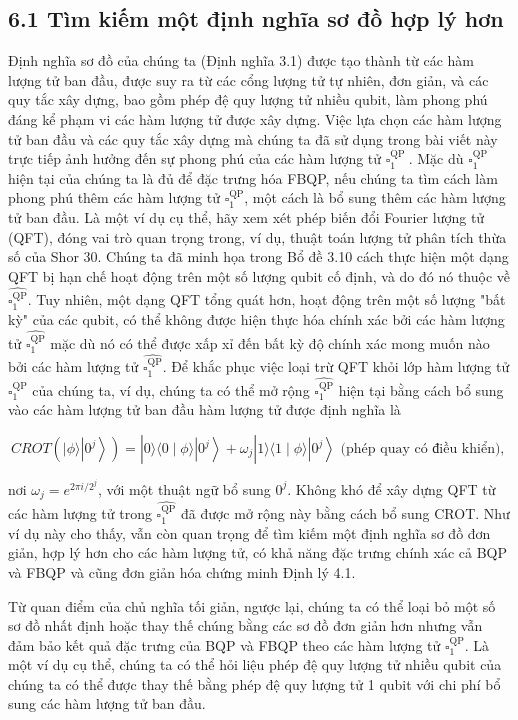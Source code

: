 \documentclass[10pt]{article}
\begin{document}
\subsection*{6.1 Tìm kiếm một định nghĩa sơ đồ hợp lý hơn}
Định nghĩa sơ đồ của chúng ta (Định nghĩa 3.1) được tạo thành từ các hàm lượng tử ban đầu, được suy ra từ các cổng lượng tử tự nhiên, đơn giản, và các quy tắc xây dựng, bao gồm phép đệ quy lượng tử nhiều qubit, làm phong phú đáng kể phạm vi các hàm lượng tử được xây dựng. Việc lựa chọn các hàm lượng tử ban đầu và các quy tắc xây dựng mà chúng ta đã sử dụng trong bài viết này trực tiếp ảnh hưởng đến sự phong phú của các hàm lượng tử $\square_{1}^{\text {QP }}$. Mặc dù $\square_{1}^{\mathrm{QP}}$ hiện tại của chúng ta là đủ để đặc trưng hóa FBQP, nếu chúng ta tìm cách làm phong phú thêm các hàm lượng tử $\square_{1}^{\mathrm{QP}}$, một cách là bổ sung thêm các hàm lượng tử ban đầu. Là một ví dụ cụ thể, hãy xem xét phép biến đổi Fourier lượng tử (QFT), đóng vai trò quan trọng trong, ví dụ, thuật toán lượng tử phân tích thừa số của Shor 30. Chúng ta đã minh họa trong Bổ đề 3.10 cách thực hiện một dạng QFT bị hạn chế hoạt động trên một số lượng qubit cố định, và do đó nó thuộc về $\widehat{\square_{1}^{\mathrm{QP}}}$. Tuy nhiên, một dạng QFT tổng quát hơn, hoạt động trên một số lượng "bất kỳ" của các qubit, có thể không được hiện thực hóa chính xác bởi các hàm lượng tử $\widehat{\square_{1}^{\mathrm{QP}}}$ mặc dù nó có thể được xấp xỉ đến bất kỳ độ chính xác mong muốn nào bởi các hàm lượng tử $\widehat{\square_{1}^{\mathrm{QP}}}$. Để khắc phục việc loại trừ QFT khỏi lớp hàm lượng tử $\square_{1}^{\mathrm{QP}}$ của chúng ta, ví dụ, chúng ta có thể mở rộng $\widehat{\square_{1}^{\mathrm{QP}}}$ hiện tại bằng cách bổ sung vào các hàm lượng tử ban đầu hàm lượng tử được định nghĩa là

$$
C R O T\left(|\phi\rangle\left|0^{j}\right\rangle\right)=|0\rangle\langle 0 \mid \phi\rangle\left|0^{j}\right\rangle+\omega_{j}|1\rangle\langle 1 \mid \phi\rangle\left|0^{j}\right\rangle \text { (phép quay có điều khiển), }
$$

nơi $\omega_{j}=e^{2 \pi i / 2^{j}}$, với một thuật ngữ bổ sung $0^{j}$. Không khó để xây dựng QFT từ các hàm lượng tử trong $\widehat{\square_{1}^{\mathrm{QP}}}$ đã được mở rộng này bằng cách bổ sung CROT. Như ví dụ này cho thấy, vẫn còn quan trọng để tìm kiếm một định nghĩa sơ đồ đơn giản, hợp lý hơn cho các hàm lượng tử, có khả năng đặc trưng chính xác cả BQP và FBQP và cũng đơn giản hóa chứng minh Định lý 4.1.

Từ quan điểm của chủ nghĩa tối giản, ngược lại, chúng ta có thể loại bỏ một số sơ đồ nhất định hoặc thay thế chúng bằng các sơ đồ đơn giản hơn nhưng vẫn đảm bảo kết quả đặc trưng của BQP và FBQP theo các hàm lượng tử $\square_{1}^{\mathrm{QP}}$. Là một ví dụ cụ thể, chúng ta có thể hỏi liệu phép đệ quy lượng tử nhiều qubit của chúng ta có thể được thay thế bằng phép đệ quy lượng tử 1 qubit với chi phí bổ sung các hàm lượng tử ban đầu.
\end{document}
